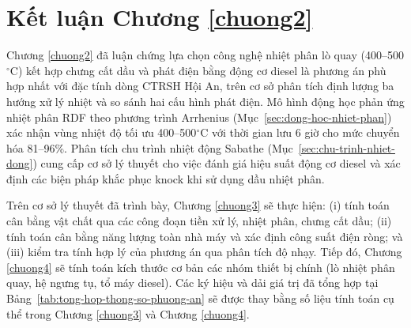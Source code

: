 \documentclass[../main.tex]{subfiles}
\begin{document}

\section*{Kết luận Chương \ref{chuong2}}

Chương \ref{chuong2} đã luận chứng lựa chọn công nghệ nhiệt phân lò quay (400--500$^\circ\mathrm{C}$) kết hợp chưng cất dầu và phát điện bằng động cơ diesel là phương án phù hợp nhất với đặc tính dòng CTRSH Hội An, trên cơ sở phân tích định lượng ba hướng xử lý nhiệt và so sánh hai cấu hình phát điện. Mô hình động học phản ứng nhiệt phân RDF theo phương trình Arrhenius (Mục~\ref{sec:dong-hoc-nhiet-phan}) xác nhận vùng nhiệt độ tối ưu 400--500$^\circ$C với thời gian lưu 6 giờ cho mức chuyển hóa 81--96\%. Phân tích chu trình nhiệt động Sabathe (Mục~\ref{sec:chu-trinh-nhiet-dong}) cung cấp cơ sở lý thuyết cho việc đánh giá hiệu suất động cơ diesel và xác định các biện pháp khắc phục knock khi sử dụng dầu nhiệt phân.

Trên cơ sở lý thuyết đã trình bày, Chương \ref{chuong3} sẽ thực hiện: (i) tính toán cân bằng vật chất qua các công đoạn tiền xử lý, nhiệt phân, chưng cất dầu; (ii) tính toán cân bằng năng lượng toàn nhà máy và xác định công suất điện ròng; và (iii) kiểm tra tính hợp lý của phương án qua phân tích độ nhạy. Tiếp đó, Chương \ref{chuong4} sẽ tính toán kích thước cơ bản các nhóm thiết bị chính (lò nhiệt phân quay, hệ ngưng tụ, tổ máy diesel). Các ký hiệu và dải giá trị đã tổng hợp tại Bảng~\ref{tab:tong-hop-thong-so-phuong-an} sẽ được thay bằng số liệu tính toán cụ thể trong Chương \ref{chuong3} và Chương \ref{chuong4}.
\end{document}

